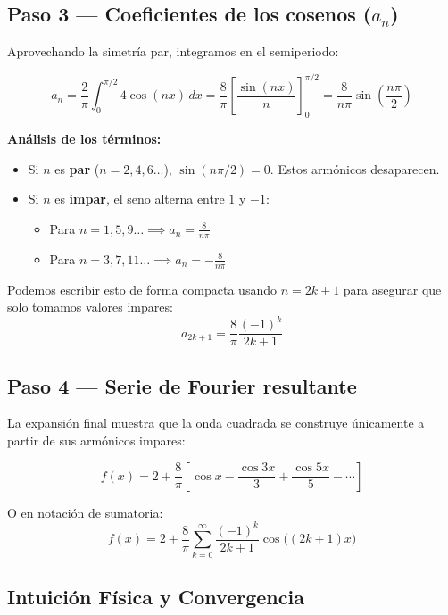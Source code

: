 \documentclass[
  letterpaper,
  DIV=11,
  numbers=noendperiod]{scrreprt}
\providecommand{\tightlist}{%
  \setlength{\itemsep}{0pt}\setlength{\parskip}{0pt}}
\begin{document}
\subsection{\texorpdfstring{Paso 3 --- Coeficientes de los cosenos
(\(a_n\))}{Paso 3 --- Coeficientes de los cosenos (a\_n)}}\label{paso-3-coeficientes-de-los-cosenos-a_n}

Aprovechando la simetría par, integramos en el semiperiodo:

\[
a_n = \frac{2}{\pi}\int_{0}^{\pi/2} 4\cos(nx)\,dx = \frac{8}{\pi} \left[ \frac{\sin(nx)}{n} \right]_{0}^{\pi/2} = \frac{8}{n\pi} \sin\left(\frac{n\pi}{2}\right)
\]

\textbf{Análisis de los términos:}

\begin{itemize}
\tightlist
\item
  Si \(n\) es \textbf{par} (\(n=2, 4, 6\dots\)), \(\sin(n\pi/2) = 0\).
  Estos armónicos desaparecen.
\item
  Si \(n\) es \textbf{impar}, el seno alterna entre \(1\) y \(-1\):

  \begin{itemize}
  \tightlist
  \item
    Para \(n=1, 5, 9\dots \implies a_n = \frac{8}{n\pi}\)
  \item
    Para \(n=3, 7, 11\dots \implies a_n = -\frac{8}{n\pi}\)
  \end{itemize}
\end{itemize}

Podemos escribir esto de forma compacta usando \(n = 2k+1\) para
asegurar que solo tomamos valores impares:
\[a_{2k+1} = \frac{8}{\pi} \frac{(-1)^k}{2k+1}\]

\subsection{Paso 4 --- Serie de Fourier
resultante}\label{paso-4-serie-de-fourier-resultante}

La expansión final muestra que la onda cuadrada se construye únicamente
a partir de sus armónicos impares:

\[
\boxed{f(x) = 2 + \frac{8}{\pi}\left[\cos x - \frac{\cos 3x}{3} + \frac{\cos 5x}{5} - \cdots\right]}
\]

O en notación de sumatoria:
\[f(x) = 2 + \frac{8}{\pi}\sum_{k=0}^{\infty}\frac{(-1)^k}{2k+1}\cos\bigl((2k+1)x\bigr)\]

\subsection{Intuición Física y
Convergencia}\label{intuiciuxf3n-fuxedsica-y-convergencia}
\end{document}
